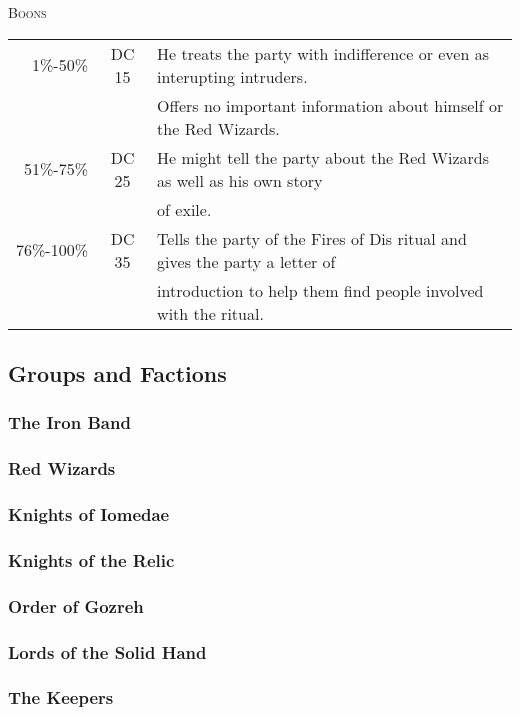 		\textsc{Boons}
		\begin{tabular}{| r | c | l}
			1\%-50\% & DC 15 & He treats the party with indifference 
						or even as interupting intruders. \\
 					& & Offers no important information about 
						himself or the Red Wizards. \\
			51\%-75\% & DC 25 & He might tell the party about the Red
						Wizards as well as his own story \\ 
					& & 	of exile. \\
			76\%-100\% & DC 35 & Tells the party of the Fires of Dis 
						ritual and gives the party a letter of \\
					& &	introduction to help them find people 
						involved with the ritual. \\ 		
		\end{tabular}

	\subsection{Groups and Factions}

		\subsubsection{The Iron Band}

		\subsubsection{Red Wizards}
	
		\subsubsection{Knights of Iomedae}

		\subsubsection{Knights of the Relic}

		\subsubsection{Order of Gozreh}

		\subsubsection{Lords of the Solid Hand}

		\subsubsection{The Keepers}


